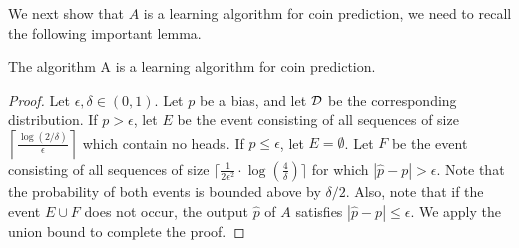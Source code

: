 \documentclass[11pt]{article}
\begin{document}
We next show that $A$ is a learning algorithm for coin prediction, we need to recall the following important lemma. 

\begin{theorem}
The algorithm A is a learning algorithm for coin prediction.
\end{theorem}
\begin{proof}
Let $\epsilon,\delta \in (0,1)$. Let $p$ be a bias, and let $\mathcal{D}$ be the corresponding distribution. If $p> \epsilon$, let $E$ be the event
consisting of all sequences of size $\left \lceil \frac{\log(2/\delta)}{\epsilon}
\right \rceil$ which contain no heads. If $p \le \epsilon$, let
$E=\emptyset$. Let $F$ be the event consisting of all sequences of size $\lceil \frac{1}{2\epsilon^2} \cdot
  \log(\frac{4}{\delta})  \rceil$ for which $|\hat{p}-p|>\epsilon$. Note
that the probability of both events is bounded above by
$\delta/2$. Also, note that if the event $E \cup F$ does not occur, the
output $\hat{p}$ of $A$ satisfies $|\hat{p}-p| \le \epsilon$. We apply the
union bound to complete the proof. 
\end{proof}
\end{document}
